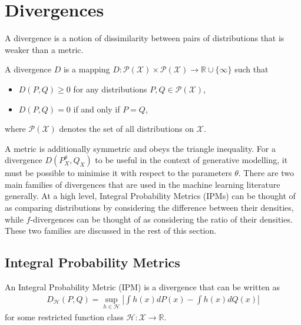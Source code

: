 \section{Divergences}\label{subsec:gen-model-divergence}

A divergence is a notion of dissimilarity between pairs of distributions that is weaker than a metric.

\medskip

\begin{definition}
A divergence $D$ is a mapping $D: \mathcal{P}(\mathcal{X}) \times \mathcal{P}(\mathcal{X}) \to \mathbb{R} \cup \{\infty\}$ such that

\begin{itemize}
\item $D(P, Q)  \geq 0$ for any distributions $P, Q \in \mathcal{P}(\mathcal{X})$,
\item $D(P, Q) = 0$ if and only if $P = Q$,
\end{itemize}

where $\mathcal{P}(\mathcal{X})$ denotes the set of all distributions on $\mathcal{X}$.
\end{definition}


A metric is additionally symmetric and obeys the triangle inequality.
For a divergence $D(P^\theta_X, Q_X)$ to be useful in the context of generative modelling, it must be possible to minimise it with respect to the parameters $\theta$. 
There are two main families of divergences that are used in the machine learning literature generally.
At a high level, Integral Probability Metrics (IPMs) can be thought of as comparing distributions by considering the difference between their densities, while $f$-divergences can be thought of as considering the ratio of their densities.
These two families are discussed in the rest of this section.

\subsection{Integral Probability Metrics}\label{subsec:intro-ipm}

\begin{definition}
An Integral Probability Metric (IPM) is a divergence that can be written as
%
\begin{align*}
D_{\mathcal{H}}(P, Q) = \sup_{h\in\mathcal{H}} \left| \int h(x) dP(x) - \int h(x) dQ(x) \right|
\end{align*}
%
for some restricted function class $\mathcal{H}: \mathcal{X} \to \mathbb{R}$. 
\end{definition}

